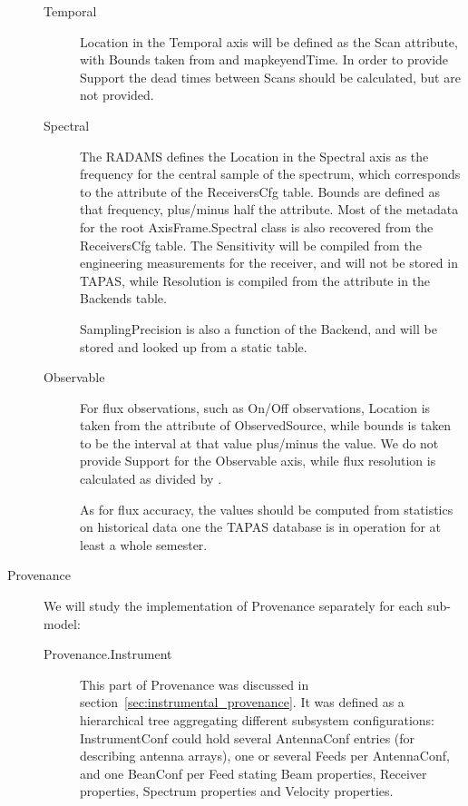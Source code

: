\begin{description}
\begin{description}
					
					\item[Temporal] Location in the Temporal axis
					will be defined as the Scan 
					attribute, with Bounds taken from
					 and mapkey{endTime}. In order
					to provide Support the dead times between Scans
					should be calculated, but are not provided.
					
					\item[Spectral] The RADAMS defines the Location
					in the Spectral axis as the frequency for the
					central sample of the spectrum, which
					corresponds to the  attribute
					of the ReceiversCfg table. Bounds are defined
					as that frequency, plus/minus half the
					 attribute. Most of the metadata
					for the root AxisFrame.Spectral class is also
					recovered from the ReceiversCfg table.
					The Sensitivity will be compiled from the
					engineering measurements for the receiver, and
					will not be stored in TAPAS, while Resolution
					is compiled from the 
					attribute in the Backends table.
					
					SamplingPrecision is also a function of the
					Backend, and will be stored and looked up from
					a static table.
					
					\item[Observable] For flux observations, such
					as On/Off observations, Location is taken
					from the  attribute of
					ObservedSource, while bounds is taken to be
					the interval at that value plus/minus the
					 value. We do not provide
					Support for the Observable axis, while
					flux resolution is calculated as 
					divided by .
					
					As for flux accuracy, the values should be
					computed from statistics on historical data
					one the TAPAS database is in operation for at
					least a whole semester.
				\end{description}

				\item[Provenance] We will study the implementation
				of Provenance separately for each sub-model:
				
				\begin{description}
					\item[Provenance.Instrument] This part of
					Provenance was discussed in
					section~\ref{sec:instrumental_provenance}. It
					was defined as a hierarchical tree aggregating
					different subsystem configurations:
					Instrument\-Conf could hold several
					Antenna\-Conf entries (for describing
					antenna arrays), one or several Feeds per
					Antenna\-Conf, and one Bean\-Conf per
					Feed stating Beam properties, Receiver
					properties, Spectrum properties and
					Velocity properties.
					

\end{description}
\end{description}
